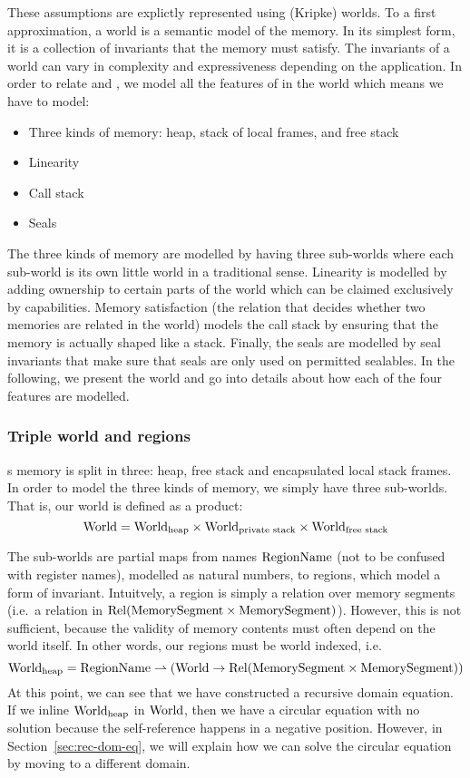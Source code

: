 \begin{jversion}
These assumptions are explictly represented using (Kripke) worlds.
To a first approximation, a world is a semantic model of the memory.
In its simplest form, it is a collection of invariants that the memory must satisfy.
The invariants of a world can vary in complexity and expressiveness depending on the application.
In order to relate \trgcm{} and \srccm{}, we model all the features of \srccm{} in the world which means we have to model:
\begin{itemize}
\item Three kinds of memory: heap, stack of local frames, and free stack
\item Linearity
\item Call stack
\item Seals
\end{itemize}
The three kinds of memory are modelled by having three sub-worlds where each sub-world is its own little world in a traditional sense.
Linearity is modelled by adding ownership to certain parts of the world which can be claimed
exclusively by capabilities.
Memory satisfaction (the relation that decides whether two memories are related in the world) models the call stack by ensuring that the memory is actually shaped like a stack.
Finally, the seals are modelled by seal invariants that make sure that seals are only used on permitted sealables.
In the following, we present the world and go into details about how each of the four features are modelled.

\subsubsection{Triple world and regions}
\srccm{}s memory is split in three: heap, free stack and encapsulated local stack frames.
In order to model the three kinds of memory, we simply have three sub-worlds.
That is, our world is defined as a product:
\[
  \mathrm{World} = \mathrm{World}_\mathrm{heap} \times \mathrm{World}_\text{private stack} \times \mathrm{World}_\text{free stack}
\]

The sub-worlds are partial maps from names $\mathrm{RegionName}$ (not to be confused with register names), modelled as natural numbers, to regions, which model a form of invariant.
Intuitvely, a region is simply a relation over memory segments (i.e.\ a relation in $\mathrm{Rel}(\mathrm{MemorySegment} \times \mathrm{MemorySegment})$).
However, this is not sufficient, because the validity of memory contents must often depend on the world itself.
In other words, our regions must be world indexed, i.e.
\[
  \mathrm{World}_\mathrm{heap} = \mathrm{RegionName} \rightharpoonup (\mathrm{World} \rightarrow \mathrm{Rel}(\mathrm{MemorySegment} \times \mathrm{MemorySegment}))
\]
At this point, we can see that we have constructed a recursive domain equation.
If we inline $\mathrm{World}_\mathrm{heap}$ in $\mathrm{World}$, then we have a circular equation with no solution because the self-reference happens in a negative position.
However, in Section~\ref{sec:rec-dom-eq}, we will explain how we can solve the circular equation by moving to a different domain.


\end{jversion}
